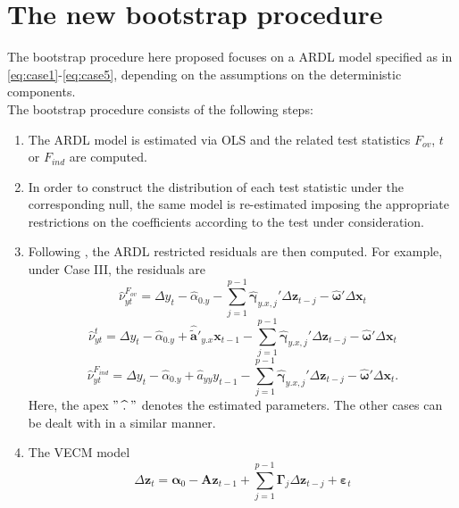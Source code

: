 \section{The new bootstrap procedure}\label{sec:boot}
The bootstrap procedure here proposed focuses on a ARDL model specified as in \eqref{eq:case1}-\eqref{eq:case5}, depending on the assumptions on the deterministic components.\\ 
The bootstrap procedure consists of the following steps:
\begin{enumerate}
\item The ARDL model is estimated via OLS and the related test statistics $F_{ov}$, $t$ or $F_{ind}$ are computed.
\item In order to construct the distribution of each test statistic under the corresponding null, the same model is re-estimated imposing the appropriate restrictions on the coefficients according to the test under consideration.
\item Following \cite{mcnown2018bootstrapping}, the ARDL restricted residuals are then computed. For example, under Case III, the residuals are
\begin{equation}\label{eq:resfov}
\widehat{\nu}_{yt}^{F_{ov}}=\Delta y_{t}-\widehat{\alpha}_{0.y}-\sum_{j=1}^{p-1}\widehat{\boldsymbol{\gamma}}_{y.x,j}'\Delta\mathbf{z}_{t-j}-\widehat{\boldsymbol{\omega}}'\Delta\mathbf{x}_{t}
\end{equation}
\begin{equation}\label{eq:rest}
\widehat{\nu}_{yt}^{t}=\Delta y_{t}-\widehat{\alpha}_{0.y}+\widehat{\widetilde{\mathbf{a}}}'_{y.x}\mathbf{x}_{t-1}-  \sum_{j=1}^{p-1}\widehat{\boldsymbol{\gamma}}_{y.x,j}'\Delta\mathbf{z}_{t-j}-\widehat{\boldsymbol{\omega}}'\Delta\mathbf{x}_{t}
\end{equation}
\begin{equation}\label{eq:resfind}
\widehat{\nu}_{yt}^{F_{ind}}=\Delta y_{t}-\widehat{\alpha}_{0.y}+\widehat{a}_{yy}y_{t-1}-  \sum_{j=1}^{p-1}\widehat{\boldsymbol{\gamma}}_{y.x,j}'\Delta\mathbf{z}_{t-j}-\widehat{\boldsymbol{\omega}}'\Delta\mathbf{x}_{t}.
\end{equation}
Here, the apex $"\widehat{\,\,.\,\,}"$ denotes the estimated parameters. The other cases can be dealt with in a similar manner.
\item The  VECM model 
\begin{equation}\label{eq:vecmhat}
 \Delta\mathbf{z}_{t}=\boldsymbol{\alpha}_{0}-\mathbf{A}\mathbf{z}_{t-1}+ \sum_{j=1}^{p-1}\boldsymbol{\Gamma}_{j}\Delta\mathbf{z}_{t-j}+\boldsymbol{\varepsilon}_{t}

\end{equation}
\end{enumerate}
